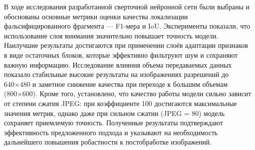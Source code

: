 В ходе исследования разработанной сверточной нейронной сети были выбраны и обоснованы основные метрики оценки качества локализации фальсифицированного фрагмента — F1-мера и IoU. Эксперименты показали, что использование слоя внимания значительно повышает точность модели. Наилучшие результаты достигаются при применении слоёв адаптации признаков в виде остаточных блоков, которые эффективно фильтруют шум и сохраняют важную информацию. Исследование влияния объема передаваемых данных показало стабильные высокие результаты на изображениях разрешений до 640×480 и заметное снижение качества при переходе к большим объемам (800×600). Кроме того, установлено, что качество работы модели сильно зависит от степени сжатия JPEG: при коэффициенте 100 достигаются максимальные значения метрик, однако даже при сильном сжатии (JPEG = 80) модель сохраняет приемлемую точность. Полученные результаты подтверждают эффективность предложенного подхода и указывают на необходимость дальнейшего повышения робастности к постобработке изображений.